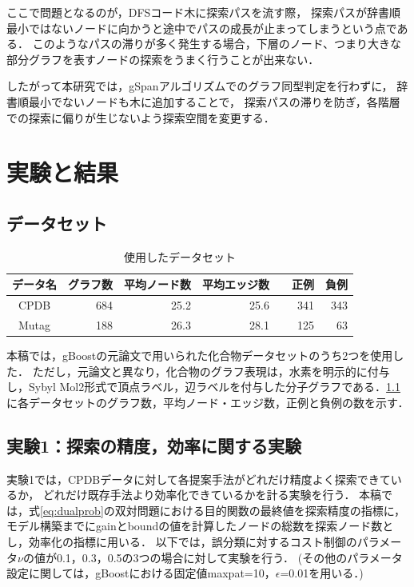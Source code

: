 ここで問題となるのが，DFSコード木に探索パスを流す際，
探索パスが辞書順最小ではないノードに向かうと途中でパスの成長が止まってしまうという点である．
このようなパスの滞りが多く発生する場合，下層のノード、つまり大きな部分グラフを表すノードの探索をうまく行うことが出来ない．

したがって本研究では，gSpanアルゴリズムでのグラフ同型判定を行わずに，
辞書順最小でないノードも木に追加することで，
探索パスの滞りを防ぎ，各階層での探索に偏りが生じないよう探索空間を変更する．

\chapter{実験と結果}
\section{データセット}
\begin{table}
	\centering
	\begin{tabular}{|c|r|r|r|r|r|}
		\hline
		データ名 & グラフ数 & 平均ノード数 & 平均エッジ数 & 正例　& 負例\\
		\hline \hline
		CPDB  & 684 & 25.2 & 25.6 & 341 & 343\\
		\hline
		Mutag & 188 & 26.3 & 28.1 & 125 & 63\\
		\hline
	\end{tabular}
	\caption{使用したデータセット}
	\label{dataset}
\end{table}

本稿では，gBoostの元論文\cite{gBoost}で用いられた化合物データセットのうち2つを使用した．
ただし，元論文\cite{gBoost}と異なり，化合物のグラフ表現は，水素を明示的に付与し，Sybyl Mol2形式で頂点ラベル，辺ラベルを付与した分子グラフである．\ref{dataset}に各データセットのグラフ数，平均ノード・エッジ数，正例と負例の数を示す．

\section{実験1：探索の精度，効率に関する実験}
実験1では，CPDBデータに対して各提案手法がどれだけ精度よく探索できているか，
どれだけ既存手法より効率化できているかを計る実験を行う．
本稿では，式\eqref{eq:dualprob}の双対問題における目的関数の最終値を探索精度の指標に，
モデル構築までにgainとboundの値を計算したノードの総数を探索ノード数とし，効率化の指標に用いる．
以下では，誤分類に対するコスト制御のパラメータ$\nu$の値が0.1，0.3，0.5の3つの場合に対して実験を行う．
(その他のパラメータ設定に関しては，gBoostにおける固定値maxpat=10，$\epsilon$=0.01を用いる．)

